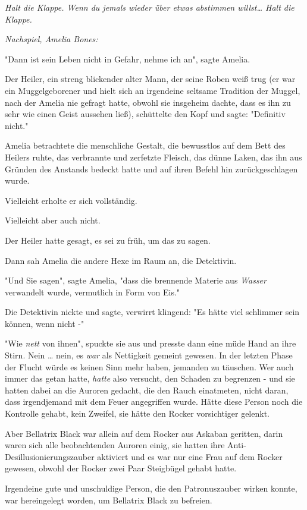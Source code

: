 {\emph{Halt die Klappe. Wenn du jemals wieder über etwas abstimmen willst… Halt die Klappe.}

\emph{\emph{Nachspiel, Amelia Bones:}}

"Dann ist sein Leben nicht in Gefahr, nehme ich an", sagte Amelia.

Der Heiler, ein streng blickender alter Mann, der seine Roben weiß trug (er war ein Muggelgeborener und hielt sich an irgendeine seltsame Tradition der Muggel, nach der Amelia nie gefragt hatte, obwohl sie insgeheim dachte, dass es ihn zu sehr wie einen Geist aussehen ließ), schüttelte den Kopf und sagte: "Definitiv nicht."

Amelia betrachtete die menschliche Gestalt, die bewusstlos auf dem Bett des Heilers ruhte, das verbrannte und zerfetzte Fleisch, das dünne Laken, das ihn aus Gründen des Anstands bedeckt hatte und auf ihren Befehl hin zurückgeschlagen wurde.

Vielleicht erholte er sich vollständig.

Vielleicht aber auch nicht.

Der Heiler hatte gesagt, es sei zu früh, um das zu sagen.

Dann sah Amelia die andere Hexe im Raum an, die Detektivin.

"Und Sie sagen", sagte Amelia, "dass die brennende Materie aus \emph{Wasser} verwandelt wurde, vermutlich in Form von Eis."

Die Detektivin nickte und sagte, verwirrt klingend: "Es hätte viel schlimmer sein können, wenn nicht -"

"Wie \emph{nett} von ihnen", spuckte sie aus und presste dann eine müde Hand an ihre Stirn. Nein … nein, es \emph{war} als Nettigkeit gemeint gewesen. In der letzten Phase der Flucht würde es keinen Sinn mehr haben, jemanden zu täuschen. Wer auch immer das getan hatte, \emph{hatte} also versucht, den Schaden zu begrenzen - und sie hatten dabei an die Auroren gedacht, die den Rauch einatmeten, nicht daran, dass irgendjemand mit dem Feuer angegriffen wurde. Hätte diese Person noch die Kontrolle gehabt, kein Zweifel, sie hätte den Rocker vorsichtiger gelenkt.

Aber Bellatrix Black war allein auf dem Rocker aus Askaban geritten, darin waren sich alle beobachtenden Auroren einig, sie hatten ihre Anti-Desillusionierungszauber aktiviert und es war nur eine Frau auf dem Rocker gewesen, obwohl der Rocker zwei Paar Steigbügel gehabt hatte.

Irgendeine gute und unschuldige Person, die den Patronuszauber wirken konnte, war hereingelegt worden, um Bellatrix Black zu befreien.

}

